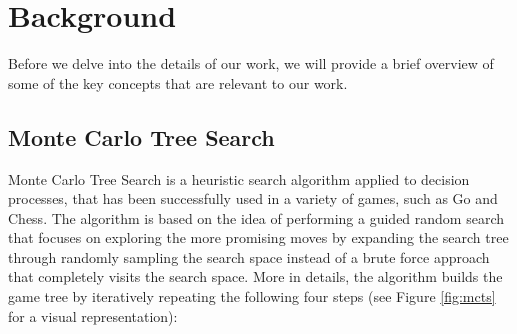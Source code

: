\section{Background}

Before we delve into the details of our work, we will provide a brief overview of some of the key concepts that are relevant to our work.

\subsection{Monte Carlo Tree Search}

Monte Carlo Tree Search \parencite{mcts} is a heuristic search algorithm applied to decision processes, that has been successfully used in a variety of games, such as Go and Chess. The algorithm is based on the idea of performing a guided random search that focuses on exploring the more promising moves by expanding the search tree through randomly sampling the search space instead of a brute force approach that completely visits the search space. More in details, the algorithm builds the game tree by iteratively repeating the following four steps (see Figure \ref{fig:mcts} for a visual representation):

